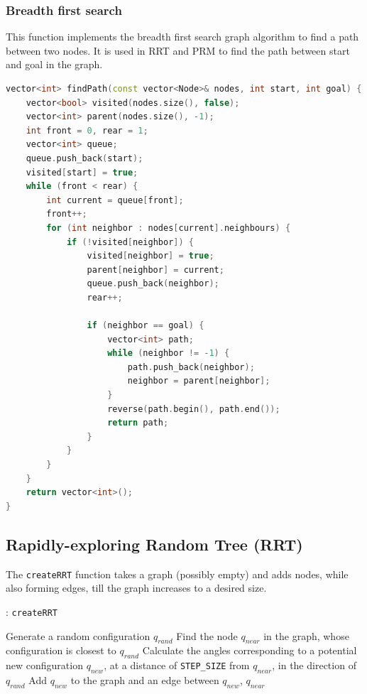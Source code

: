 \documentclass[11pt]{article}
\begin{document}
\subsubsection{Breadth first search}
This function implements the breadth first search graph algorithm to find a path between two nodes. It is 
used in RRT and PRM to find the path between start and goal in the graph. 
\begin{lstlisting}[language=c++]
vector<int> findPath(const vector<Node>& nodes, int start, int goal) {
    vector<bool> visited(nodes.size(), false);
    vector<int> parent(nodes.size(), -1);
    int front = 0, rear = 1;
    vector<int> queue;
    queue.push_back(start);
    visited[start] = true;
    while (front < rear) {
        int current = queue[front];
        front++;
        for (int neighbor : nodes[current].neighbours) {
            if (!visited[neighbor]) {
                visited[neighbor] = true;
                parent[neighbor] = current;
                queue.push_back(neighbor);
                rear++;

                if (neighbor == goal) {
                    vector<int> path;
                    while (neighbor != -1) {
                        path.push_back(neighbor);
                        neighbor = parent[neighbor];
                    }
                    reverse(path.begin(), path.end());
                    return path;
                }
            }
        }
    }
    return vector<int>();
}
\end{lstlisting}

\subsection{Rapidly-exploring Random Tree (RRT)}
The \texttt{createRRT} function takes a graph (possibly empty) and adds nodes, while also forming edges, till
the graph increases to a desired size. 
\begin{algorithm}
    \caption{ : \texttt{createRRT}}\label{alg:cap}
    \begin{algorithmic}[1]
        \State  Generate a random configuration $q_{rand}$
        \State Find the node $q_{near}$ in the graph, whose configuration is closest to $q_{rand}$
        \State Calculate the angles corresponding to a potential new configuration $q_{new}$, at a distance of \texttt{STEP\_SIZE}
           from $q_{near}$, in the direction of $q_{rand}$
            \State Add $q_{new}$ to the graph and an edge between $q_{new}$, $q_{near}$
        \EndIf
    \EndWhile
    \end{algorithmic}
\end{algorithm}
\end{document}
